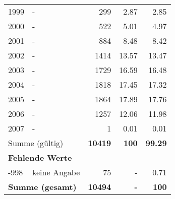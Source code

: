 \begin{longtable}{lXrrr}
        1999 & \multicolumn{1}{X}{-} & %
          \num{299} &
          \num[round-mode=places,round-precision=2]{2,87} &
          \num[round-mode=places,round-precision=2]{2,85} \\

        2000 & \multicolumn{1}{X}{-} & %
          \num{522} &
          \num[round-mode=places,round-precision=2]{5,01} &
          \num[round-mode=places,round-precision=2]{4,97} \\

        2001 & \multicolumn{1}{X}{-} & %
          \num{884} &
          \num[round-mode=places,round-precision=2]{8,48} &
          \num[round-mode=places,round-precision=2]{8,42} \\

        2002 & \multicolumn{1}{X}{-} & %
          \num{1414} &
          \num[round-mode=places,round-precision=2]{13,57} &
          \num[round-mode=places,round-precision=2]{13,47} \\

        2003 & \multicolumn{1}{X}{-} & %
          \num{1729} &
          \num[round-mode=places,round-precision=2]{16,59} &
          \num[round-mode=places,round-precision=2]{16,48} \\

        2004 & \multicolumn{1}{X}{-} & %
          \num{1818} &
          \num[round-mode=places,round-precision=2]{17,45} &
          \num[round-mode=places,round-precision=2]{17,32} \\

        2005 & \multicolumn{1}{X}{-} & %
          \num{1864} &
          \num[round-mode=places,round-precision=2]{17,89} &
          \num[round-mode=places,round-precision=2]{17,76} \\

        2006 & \multicolumn{1}{X}{-} & %
          \num{1257} &
          \num[round-mode=places,round-precision=2]{12,06} &
          \num[round-mode=places,round-precision=2]{11,98} \\

        2007 & \multicolumn{1}{X}{-} & %
          \num{1} &
          \num[round-mode=places,round-precision=2]{0,01} &
          \num[round-mode=places,round-precision=2]{0,01} \\

     \midrule
     \multicolumn{2}{l}{Summe (gültig)} &
       \textbf{\num{10419}} &
     \textbf{100} &
       \textbf{\num[round-mode=places,round-precision=2]{99,29}} \\
     \multicolumn{5}{l}{\textbf{Fehlende Werte}}\\
       -998 &
       keine Angabe &
         \num{75} &
        - &
         \num[round-mode=places,round-precision=2]{0,71} \\
     \midrule
     \multicolumn{2}{l}{\textbf{Summe (gesamt)}} &
          \textbf{\num{10494}} &
        \textbf{-} &
        \textbf{100} \\
     \bottomrule
     \end{longtable}
     
